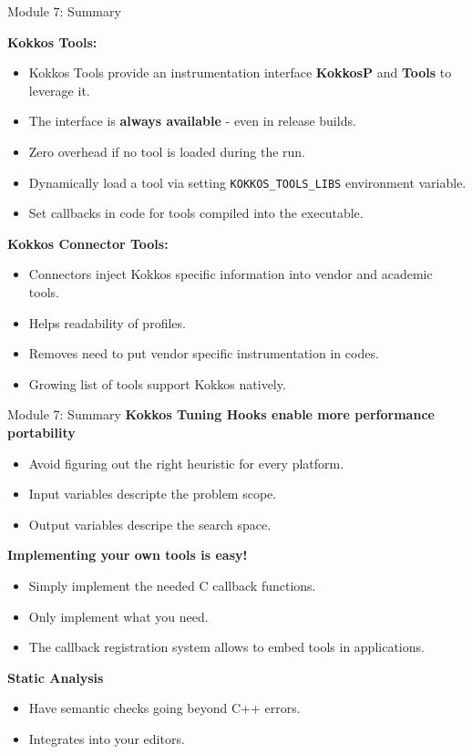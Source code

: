 

%




\begin{frame}[fragile]{Module 7: Summary}

\textbf{Kokkos Tools:}
\begin{itemize}
  \item Kokkos Tools provide an instrumentation interface \textbf{KokkosP} and \textbf{Tools} to leverage it.
  \item The interface is \textbf{always available} - even in release builds.
  \item Zero overhead if no tool is loaded during the run.
  \item Dynamically load a tool via setting \texttt{KOKKOS\_TOOLS\_LIBS} environment variable.
  \item Set callbacks in code for tools compiled into the executable. 
\end{itemize}

\textbf{Kokkos Connector Tools:}
\begin{itemize}
  \item Connectors inject Kokkos specific information into vendor and academic tools.
  \item Helps readability of profiles.
  \item Removes need to put vendor specific instrumentation in codes.
  \item Growing list of tools support Kokkos natively.
\end{itemize}
\end{frame}

\begin{frame}[fragile]{Module 7: Summary}
\textbf{Kokkos Tuning Hooks enable more performance portability}
\begin{itemize}
  \item Avoid figuring out the right heuristic for every platform.
  \item Input variables descripte the problem scope.
  \item Output variables descripe the search space.
\end{itemize}

\textbf{Implementing your own tools is easy!}
\begin{itemize}
  \item Simply implement the needed C callback functions.
  \item Only implement what you need.
  \item The callback registration system allows to embed tools in applications.
\end{itemize}

\textbf{Static Analysis}
\begin{itemize}
  \item Have semantic checks going beyond C++ errors.
  \item Integrates into your editors.
\end{itemize}
\end{frame}

